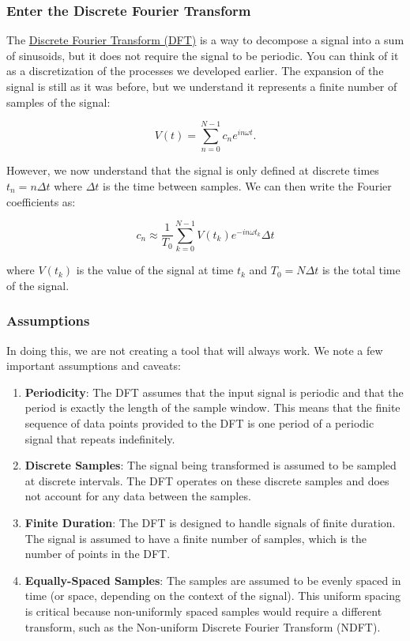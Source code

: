\subsubsection{Enter the Discrete Fourier
Transform}\label{enter-the-discrete-fourier-transform}

The
\href{https://en.wikipedia.org/wiki/Discrete_Fourier_transform}{Discrete
Fourier Transform (DFT)} is a way to decompose a signal into a sum of
sinusoids, but it does not require the signal to be periodic. You can
think of it as a discretization of the processes we developed earlier.
The expansion of the signal is still as it was before, but we understand
it represents a finite number of samples of the signal:

\[V(t) = \sum_{n=0}^{N-1} c_n e^{i n \omega t}.\]

However, we now understand that the signal is only defined at discrete
times \(t_n = n \Delta t\) where \(\Delta t\) is the time between
samples. We can then write the Fourier coefficients as:

\[c_n \approx \frac{1}{T_0} \sum_{k=0}^{N-1} V(t_k)e^{-i n \omega t_k} \Delta t\]

where \(V(t_k)\) is the value of the signal at time \(t_k\) and
\(T_0 = N \Delta t\) is the total time of the signal.

\subsubsection{Assumptions}\label{assumptions}

In doing this, we are not creating a tool that will always work. We note
a few important assumptions and caveats:

\begin{enumerate}
\def\labelenumi{\arabic{enumi}.}
\item
  \textbf{Periodicity}: The DFT assumes that the input signal is
  periodic and that the period is exactly the length of the sample
  window. This means that the finite sequence of data points provided to
  the DFT is one period of a periodic signal that repeats indefinitely.
\item
  \textbf{Discrete Samples}: The signal being transformed is assumed to
  be sampled at discrete intervals. The DFT operates on these discrete
  samples and does not account for any data between the samples.
\item
  \textbf{Finite Duration}: The DFT is designed to handle signals of
  finite duration. The signal is assumed to have a finite number of
  samples, which is the number of points in the DFT.
\item
  \textbf{Equally-Spaced Samples}: The samples are assumed to be evenly
  spaced in time (or space, depending on the context of the signal).
  This uniform spacing is critical because non-uniformly spaced samples
  would require a different transform, such as the Non-uniform Discrete
  Fourier Transform (NDFT).
\end{enumerate}

